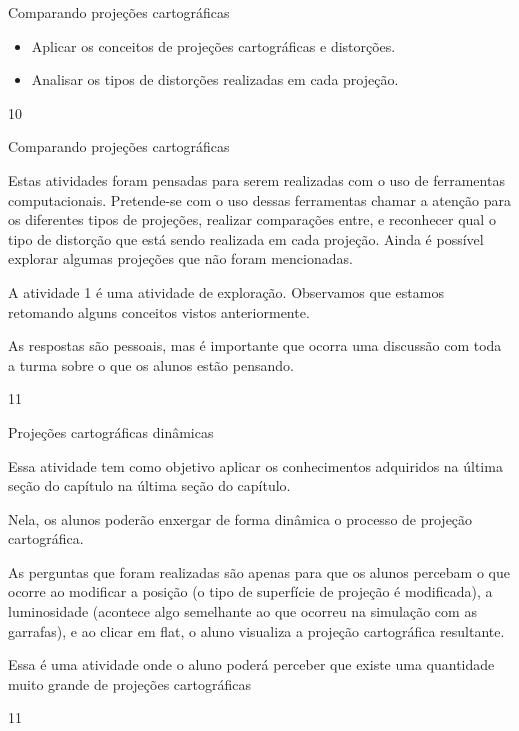 \begin{objectives}{Comparando projeções cartográficas}
{
  \begin{itemize}
  \item Aplicar os conceitos de projeções cartográficas e distorções.
  \item Analisar os tipos de distorções realizadas em cada projeção.
  \end{itemize}
}{1}{0}
\end{objectives}
\clearmargin
\begin{sugestions}{Comparando projeções cartográficas}
{
  Estas atividades foram pensadas para serem realizadas com o uso de ferramentas computacionais. Pretende-se com o uso dessas ferramentas chamar a atenção para os diferentes tipos de projeções, realizar comparações entre, e reconhecer qual o tipo de distorção que está sendo realizada em cada projeção. Ainda é possível explorar algumas projeções que não foram mencionadas.

  A atividade 1 é uma atividade de exploração. Observamos que estamos retomando alguns conceitos vistos anteriormente.

  As respostas são pessoais, mas é importante que ocorra uma discussão com toda a turma sobre o que os alunos estão pensando.
}{1}{1}
\end{sugestions}
\begin{objectives}{Projeções cartográficas dinâmicas}
{
  Essa atividade tem como objetivo aplicar os conhecimentos adquiridos na última seção do capítulo na última seção do capítulo.

  Nela, os alunos poderão enxergar de forma dinâmica o processo de projeção cartográfica.

  As perguntas que foram realizadas são apenas para que os alunos percebam o que ocorre ao modificar a posição (o tipo de superfície de projeção é modificada), a luminosidade (acontece algo semelhante ao que ocorreu na simulação com as garrafas), e ao clicar em flat, o aluno visualiza a projeção cartográfica resultante.

  Essa é uma atividade onde o aluno poderá perceber que existe uma quantidade muito grande de projeções cartográficas
}{1}{1}
\end{objectives}

